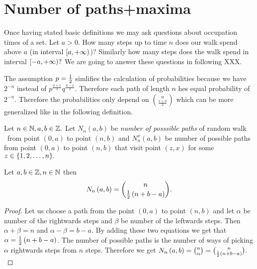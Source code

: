 \chapter{Number of paths+maxima}
\begin{rem}
  Once having stated basic definitions we may ask questions about occupation times of a set. Let $a>0$. How many steps up to time $n$ does our walk spend above $a$ (in interval $[a,{+\infty})$)? Similarly how many steps does the walk spend in interval $[-a,{+\infty})?$ We are going to answer these questions in following XXX\todo.
\end{rem}

\begin{rem}
  The assumption $p=\frac{1}{2}$ simlifies the calculation of probabilities because we have $2^{-n}$ instead of $p^{\frac{n+x}{2}}q^{\frac{n-x}{2}}.$ Therefore each path of length $n$ hes equal probability of $2^{-n}.$
  Therefore the probabilities only depend on $\binom{n}{\frac{x+n}{2}}$ which can be more generalized like in the following definition.
\end{rem}

\begin{defn}\label{defn-number_possible_paths}
 Let $n \in \mathbb{N}, a,b \in \mathbb{Z}.$ Let $N_n \left( a,b \right)$ be \emph{number of posssible paths} of random walk \rw\ from point $ \left( 0,a \right) $ to point $ \left( n,b \right)$
 and $N_n^x \left( a,b \right) $ be number of possible paths from point $ \left( 0,a \right) $ to point $\left( n,b \right)$
 that visit point $\left(z,x\right)$ for some $z \in \{1,2,\ldots, n\}.$
\end{defn}
\begin{thm}\label{thm-number_of_possible_paths}
 Let $a,b \in \mathbb{Z}, n \in \mathbb{N}$ then
 \[
    N_n \left( a,b \right) =\binom{n}{\frac{1}{2} \left(n+b-a \right)}.
  \]
\end{thm}
\begin{proof}
 Let us choose a path from the point $ \left( 0,a \right) $ to point $ \left( n,b \right) $ and let $\alpha$ be number of the rightwards steps and $\beta$ be number of the leftwards steps.
 Then $\alpha+\beta=n$ and $\alpha-\beta=b-a$. By adding these two equations we get that $\alpha=\frac{1}{2} \left( n+b-a \right) $.
 The number of possible paths is the number of ways of picking $\alpha$ rightwards steps from $n$ steps.
 Therefore we get $N_n \left( a,b \right) =\binom{n}{\alpha}=\binom{n}{\frac{1}{2} \left( n+b-a \right) }.$
\end{proof}

